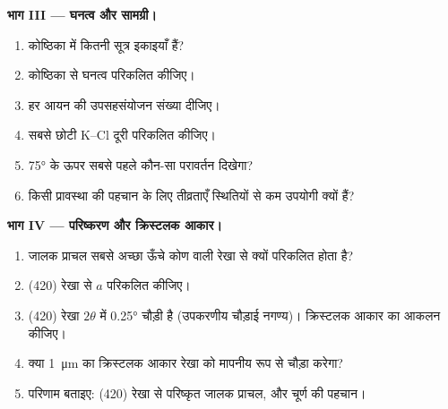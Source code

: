 \begin{problem}
\medskip\noindent\textbf{भाग III --- घनत्व और सामग्री।}
\begin{enumerate}[resume]
  \item कोष्ठिका में कितनी सूत्र इकाइयाँ हैं?
  \item कोष्ठिका से घनत्व परिकलित कीजिए।
  \item हर आयन की उपसहसंयोजन संख्या दीजिए।
  \item सबसे छोटी K--Cl दूरी परिकलित कीजिए।
  \item \ang{75} के ऊपर सबसे पहले कौन-सा परावर्तन दिखेगा?
  \item किसी प्रावस्था की पहचान के लिए तीव्रताएँ स्थितियों से कम उपयोगी क्यों हैं?
\end{enumerate}

\medskip\noindent\textbf{भाग IV --- परिष्करण और क्रिस्टलक आकार।}
\begin{enumerate}[resume]
  \item जालक प्राचल सबसे अच्छा ऊँचे कोण वाली रेखा से क्यों परिकलित होता है?
  \item (420) रेखा से $a$ परिकलित कीजिए।
  \item (420) रेखा $2\theta$ में \ang{0.25} चौड़ी है (उपकरणीय चौड़ाई
        नगण्य)। क्रिस्टलक आकार का आकलन कीजिए।
  \item क्या \qty{1}{\micro m} का क्रिस्टलक आकार रेखा को मापनीय रूप से चौड़ा करेगा?
  \item परिणाम बताइए: (420) रेखा से परिष्कृत जालक प्राचल, और
        चूर्ण की पहचान।
\end{enumerate}
\end{problem}
